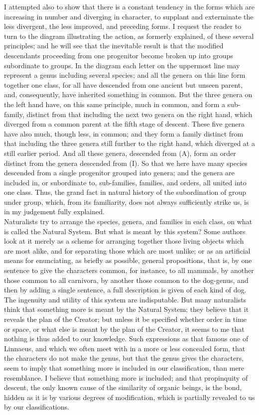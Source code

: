 \indent I attempted also to show that there is a constant tendency in the forms which are increasing in number and diverging in character, to supplant and exterminate the less divergent, the less improved, and preceding forms. I request the reader to turn to the diagram illustrating the action, as formerly explained, of these several principles; and he will see that the inevitable result is that the modified descendants proceeding from one progenitor become broken up into groups subordinate to groups. In the diagram each letter on the uppermost line may represent a genus including several species; and all the genera on this line form together one class, for all have descended from one ancient but unseen parent, and, consequently, have inherited something in common. But the three genera on the left hand have, on this same principle, much in common, and form a sub-family, distinct from that including the next two genera on the right hand, which diverged from a common parent at the fifth stage of descent. These five genera have also much, though less, in common; and they form a family distinct from that including the three genera still further to the right hand, which diverged at a still earlier period. And all these genera, descended from (A), form an order distinct from the genera descended from (I). So that we here have many species descended from a single progenitor grouped into genera; and the genera are included in, or subordinate to, sub-families, families, and orders, all united into one class. Thus, the grand fact in natural history of the subordination of group under group, which, from its familiarity, does not always sufficiently strike us, is in my judgement fully explained.~\\
\indent Naturalists try to arrange the species, genera, and families in each class, on what is called the Natural System. But what is meant by this system? Some authors look at it merely as a scheme for arranging together those living objects which are most alike, and for separating those which are most unlike; or as an artificial means for enunciating, as briefly as possible, general propositions, that is, by one sentence to give the characters common, for instance, to all mammals, by another those common to all carnivora, by another those common to the dog-genus, and then by adding a single sentence, a full description is given of each kind of dog. The ingenuity and utility of this system are indisputable. But many naturalists think that something more is meant by the Natural System; they believe that it reveals the plan of the Creator; but unless it be specified whether order in time or space, or what else is meant by the plan of the Creator, it seems to me that nothing is thus added to our knowledge. Such expressions as that famous one of Linnaeus, and which we often meet with in a more or less concealed form, that the characters do not make the genus, but that the genus gives the characters, seem to imply that something more is included in our classification, than mere resemblance. I believe that something more is included; and that propinquity of descent, the only known cause of the similarity of organic beings, is the bond, hidden as it is by various degrees of modification, which is partially revealed to us by our classifications.~\\
